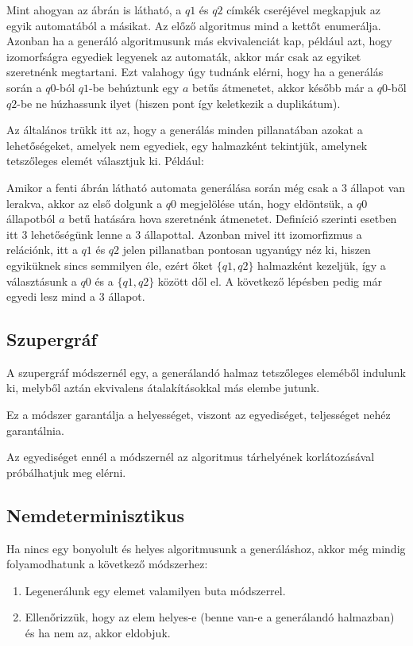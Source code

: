 \documentclass[12pt]{report}
\theoremstyle{definition}
\begin{document}
Mint ahogyan az ábrán is látható, a $q1$ és $q2$ címkék cseréjével megkapjuk az egyik automatából a másikat. Az előző algoritmus mind a kettőt enumerálja. Azonban ha a generáló algoritmusunk más ekvivalenciát kap, például azt, hogy izomorfságra egyediek legyenek az automaták, akkor már csak az egyiket szeretnénk megtartani. Ezt valahogy úgy tudnánk elérni, hogy ha a generálás során a $q0$-ból $q1$-be behúztunk egy $a$ betűs átmenetet, akkor később már a $q0$-ből $q2$-be ne húzhassunk ilyet (hiszen pont így keletkezik a duplikátum).

Az általános trükk itt az, hogy a generálás minden pillanatában azokat a lehetőségeket, amelyek nem egyediek, egy halmazként tekintjük, amelynek tetszőleges elemét választjuk ki. Például:

Amikor a fenti ábrán látható automata generálása során még csak a 3 állapot van lerakva, akkor az első dolgunk a $q0$ megjelölése után, hogy eldöntsük, a $q0$ állapotból $a$ betű hatására hova szeretnénk átmenetet. Definíció szerinti esetben itt 3 lehetőségünk lenne a 3 állapottal. Azonban mivel itt izomorfizmus a relációnk, itt a $q1$ és $q2$ jelen pillanatban pontosan ugyanúgy néz ki, hiszen egyiküknek sincs semmilyen éle, ezért őket $\{q1,q2\}$ halmazként kezeljük, így a választásunk a $q0$ és a $\{q1,q2\}$ között dől el. A következő lépésben pedig már egyedi lesz mind a 3 állapot.

\pagebreak
\subsection{Szupergráf}
A szupergráf módszernél egy, a generálandó halmaz tetszőleges eleméből indulunk ki, melyből aztán ekvivalens átalakításokkal más elembe jutunk.

Ez a módszer garantálja a helyességet, viszont az egyediséget, teljességet nehéz garantálnia.

Az egyediséget ennél a módszernél az algoritmus tárhelyének korlátozásával próbálhatjuk meg elérni.

\subsection{Nemdeterminisztikus}
Ha nincs egy bonyolult és helyes algoritmusunk a generáláshoz, akkor még mindig folyamodhatunk a következő módszerhez:
\begin{enumerate}
\item Legenerálunk egy elemet valamilyen buta módszerrel.
\item Ellenőrizzük, hogy az elem helyes-e (benne van-e a generálandó halmazban) és ha nem az, akkor eldobjuk.
\end{enumerate}
\end{document}
